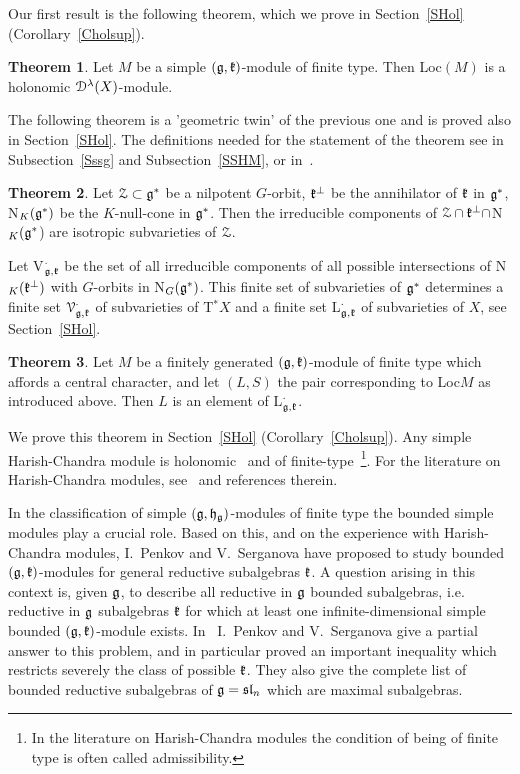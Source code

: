 \documentclass[12pt]{amsart}
\theoremstyle{definition}\newtheorem{theorem}{Theorem}[section]
\theoremstyle{definition}\newtheorem{definition}[proposition]{Definition}
\theoremstyle{remark}\newtheorem{example}[proposition]{Example}
\begin{document}
Our first result is the following theorem, which we prove in Section~\ref{SHol} (Corollary~\ref{Cholsup}).
\begin{theorem}\label{THol} Let $M$ be a simple $(\frak g, \frak k)$-module of finite type. Then Loc$(M)$ is a holonomic $\EuScript D^\lambda(X)$-module.\end{theorem}
The following theorem is a 'geometric twin' of the previous one and is proved also in Section~\ref{SHol}. The definitions needed for the statement of the theorem see in Subsection~\ref{Sssg} and Subsection~\ref{SSHM}, or in~\cite{VP}.
\begin{theorem}\label{TGeo} Let $\EuScript Z\subset\frak g^*$ be a nilpotent $G$-orbit, $\frak k^\bot$ be the annihilator of $\frak k$ in $\frak g^*$, N$_K(\frak g^*)$ be the $K$-null-cone in $\frak g^*$. Then the irreducible components of $\EuScript Z\cap\frak k^\bot\cap$N$_K(\frak g^*$) are isotropic subvarieties of $\EuScript Z$.\end{theorem}
Let V$_{\frak g, \frak k}^\cdot$ be the set of all irreducible components of all possible intersections of N$_K(\frak k^\bot)$ with $G$-orbits in N$_G(\frak g^*)$. This finite set of subvarieties of $\frak g^*$ determines a finite set $\EuScript V_{\frak g, \frak k}^\cdot$ of subvarieties of T$^*X$ and a finite set L$_{\frak g, \frak k}^\cdot$ of subvarieties of $X$, see Section~\ref{SHol}.
\begin{theorem}\label{TSup} Let $M$ be a finitely generated $(\frak g, \frak k)$-module of finite type which affords a central character, and let $(L, S)$ the pair corresponding to Loc$M$ as introduced above. Then $L$ is an element of L$_{\frak g, \frak k}^\cdot$.\end{theorem}
We prove this theorem in Section~\ref{SHol} (Corollary~\ref{Cholsup}). Any simple Harish-Chandra module is holonomic~\cite{BeBe} and of finite-type~\cite{HC}\footnote{In the literature on Harish-Chandra modules the condition of being of finite type is often called admissibility.}. For the literature on Harish-Chandra modules, see~\cite{KV} and references therein.

In the classification of simple $(\frak g, \frak h_\frak g)$-modules of finite type the bounded simple modules play a crucial role. Based on this, and on the experience with Harish-Chandra modules, I.~Penkov and V.~Serganova have proposed to study bounded $(\frak g, \frak k)$-modules for general reductive subalgebras $\frak k$. A question arising in this context is, given $\frak g$, to describe all reductive in $\frak g$ bounded subalgebras, i.e. reductive in $\frak g$ subalgebras $\frak k$ for which at least one infinite-dimensional simple bounded $(\frak g, \frak k)$-module exists. In~\cite{PS} I.~Penkov and V.~Serganova give a partial answer to this problem, and in particular proved an important inequality which restricts
severely the class of possible $\frak k$. They also give the complete list of bounded reductive subalgebras of $\frak g =\frak{sl}_n$ which are maximal subalgebras.
\end{document}
